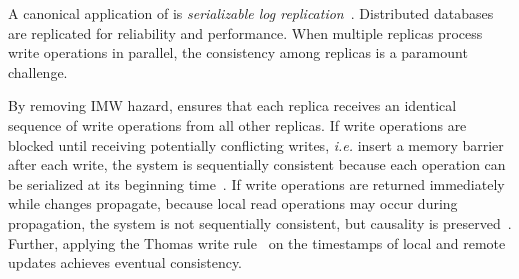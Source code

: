 A canonical application of \sys is \textit{serializable log replication}~\cite{birman1985replication,petersen1997flexible,belaramani2006practi}.
Distributed databases are replicated for reliability and performance.
When multiple replicas process write operations in parallel, the consistency among replicas is a paramount challenge.


By removing IMW hazard, \sys ensures that each replica receives an identical sequence of write operations from all other replicas.
If write operations are blocked until receiving potentially conflicting writes, \textit{i.e.} insert a memory barrier after each write, the system is sequentially consistent because each operation can be serialized at its beginning time~\cite{lu2016snow}.
If write operations are returned immediately while changes propagate, because local read operations may occur during propagation, the system is not sequentially consistent, but causality is preserved~\cite{terry1995managing}.
Further, applying the Thomas write rule~\cite{thomas1979majority} on the timestamps of local and remote updates achieves eventual consistency.


